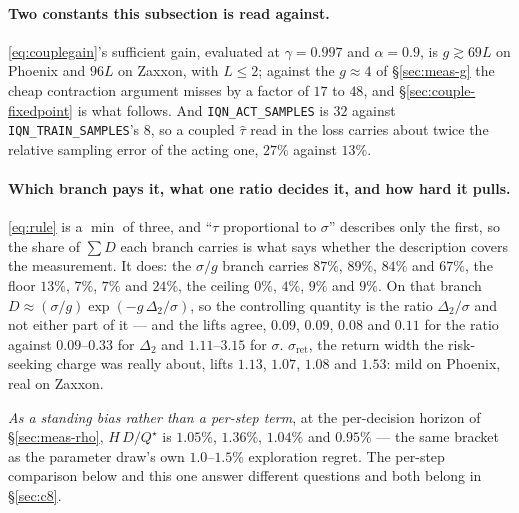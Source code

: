 \documentclass{article}
\newcommand{\gap}{\Delta}
\newcommand{\sret}{\sigma_{\mathrm{ret}}}
\newcommand{\srank}{\sigma}
\begin{document}
\paragraph{Two constants this subsection is read against.} \eqref{eq:couplegain}'s sufficient
gain, evaluated at $\gamma = 0.997$ and $\alpha = 0.9$, is $g \gtrsim 69L$ on Phoenix and
$96L$ on Zaxxon, with $L \le 2$; against the $g \approx 4$ of \S\ref{sec:meas-g} the cheap
contraction argument misses by a factor of $17$ to $48$, and \S\ref{sec:couple-fixedpoint} is
what follows. And \texttt{IQN\_ACT\_SAMPLES} is $32$ against \texttt{IQN\_TRAIN\_SAMPLES}'s $8$,
so a coupled $\hat\tau$ read in the loss carries about twice the relative sampling error of the
acting one, $27\%$ against $13\%$.

\paragraph{Which branch pays it, what one ratio decides it, and how hard it pulls.}
\eqref{eq:rule} is a $\min$ of three, and ``$\tau$ proportional to $\srank$'' describes only the
first, so the share of $\sum D$ each branch carries is what says whether the description covers
the measurement. It does: the $\srank/g$ branch carries $87\%$, $89\%$, $84\%$ and $67\%$, the
floor $13\%$, $7\%$, $7\%$ and $24\%$, the ceiling $0\%$, $4\%$, $9\%$ and $9\%$. On that branch
$D \approx (\srank/g)\exp(-g\,\gap_2/\srank)$, so the controlling quantity is the ratio
$\gap_2/\srank$ and not either part of it --- and the lifts agree, $0.09$, $0.09$, $0.08$ and
$0.11$ for the ratio against $0.09$--$0.33$ for $\gap_2$ and $1.11$--$3.15$ for $\srank$.
$\sret$, the return width the risk-seeking charge was really about, lifts $1.13$, $1.07$, $1.08$
and $1.53$: mild on Phoenix, real on Zaxxon.

\emph{As a standing bias rather than a per-step term}, at the per-decision horizon of
\S\ref{sec:meas-rho}, $H\,D/Q^\star$ is $1.05\%$, $1.36\%$, $1.04\%$ and $0.95\%$ --- the same
bracket as the parameter draw's own $1.0$--$1.5\%$ exploration regret. The per-step comparison
below and this one answer different questions and both belong in \S\ref{sec:c8}.
\end{document}
